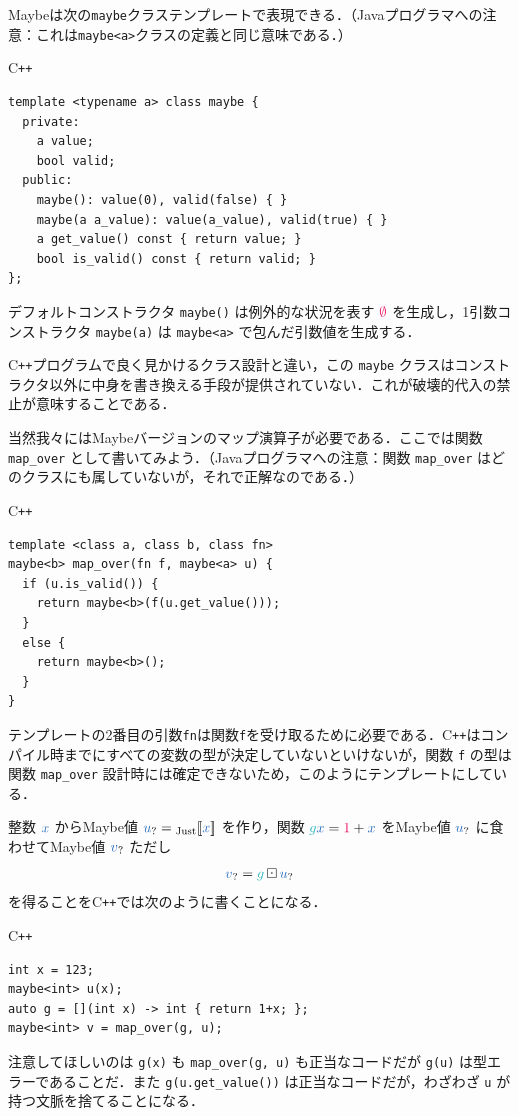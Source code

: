 \documentclass[a5paper,twoside,fleqn,draft]{jsbook}
\def\[{[\![}
\def\]{]\!]}
\def\constantColor{WildStrawberry}
\def\varColor{NavyBlue}
\def\funcColor{BlueGreen}
\newcommand{\programminglanguage}[1]{\textsf{#1}}
\newcommand{\cxx}{\programminglanguage{C}\texttt{++}}
\newcommand{\cxxzerothree}{\cxx\programminglanguage{03}}
\newcommand{\java}{\programminglanguage{Java}}
\newcommand{\code}[1]{\texttt{#1}}
\newenvironment{cxxcode}{\begin{itembox}[r]{\cxx}}{\end{itembox}}
\newcommand{\mConstant}[1]{\textcolor{\constantColor}{#1}}
\newcommand{\mOneNumber}{{\mConstant{1}}}
\newcommand{\mNothing}{\textcolor{\constantColor}{\emptyset}}
\newcommand{\mVar}[1]{\textcolor{\varColor}{#1}}
\newcommand{\mXVar}{\mVar{x}}
\newcommand{\mFunc}[1]{\textcolor{\funcColor}{#1}}
\newcommand{\mGFunc}{\mFunc{g}}
\DeclareMathOperator{\mMapMaybe}{\boxdot}
\newcommand{\mValueConstructor}[1]{\mathrm{#1}}
\newcommand{\mValueWith}[2]{{}_\mValueConstructor{#1}\[\mVar{#2}\]}
\newcommand{\mJustWith}[1]{\mValueWith{Just}{#1}}
\newcommand{\mMaybe}[1]{\mVar{#1}_?}
\begin{document}
Maybeは次の\code{maybe}クラステンプレートで表現できる．（\java プログラマへの注意：これは\code{maybe<a>}クラスの定義と同じ意味である．）
\begin{cxxcode}
\begin{verbatim}
template <typename a> class maybe {
  private:
    a value;
    bool valid;
  public:
    maybe(): value(0), valid(false) { }
    maybe(a a_value): value(a_value), valid(true) { }
    a get_value() const { return value; }
    bool is_valid() const { return valid; }
};
\end{verbatim}
\end{cxxcode}
デフォルトコンストラクタ \code{maybe()} は例外的な状況を表す $\mNothing$ を生成し，1引数コンストラクタ \code{maybe(a)} は \code{maybe<a>} で包んだ引数値を生成する．

\cxx プログラムで良く見かけるクラス設計と違い，この \code{maybe} クラスはコンストラクタ以外に中身を書き換える手段が提供されていない．これが破壊的代入の禁止が意味することである．

当然我々にはMaybeバージョンのマップ演算子が必要である．ここでは関数 \code{map\_over} として書いてみよう．（\java プログラマへの注意：関数 \code{map\_over} はどのクラスにも属していないが，それで正解なのである．）
\begin{cxxcode}
\begin{verbatim}
template <class a, class b, class fn>
maybe<b> map_over(fn f, maybe<a> u) {
  if (u.is_valid()) {
    return maybe<b>(f(u.get_value()));
  }
  else {
    return maybe<b>();
  }
}
\end{verbatim}
\end{cxxcode}
テンプレートの2番目の引数\code{fn}は関数\code{f}を受け取るために必要である．\cxx はコンパイル時までにすべての変数の型が決定していないといけないが，関数 \code{f} の型は関数 \code{map\_over} 設計時には確定できないため，このようにテンプレートにしている．

整数 $\mXVar$ からMaybe値 $\mMaybe{u}=\mJustWith{x}$ を作り，関数 $\mGFunc\mXVar=\mOneNumber+\mXVar$ をMaybe値 $\mMaybe{u}$ に食わせてMaybe値 $\mMaybe{v}$ ただし
\begin{equation}
  \mMaybe{v}
  =\mGFunc\mMapMaybe\mMaybe{u}
\end{equation}
を得ることを\cxx では次のように書くことになる．
\begin{cxxcode}
\begin{verbatim}
int x = 123;
maybe<int> u(x);
auto g = [](int x) -> int { return 1+x; };
maybe<int> v = map_over(g, u);
\end{verbatim}
\end{cxxcode}
注意してほしいのは \code{g(x)} も \code{map\_over(g, u)} も正当なコードだが \code{g(u)} は型エラーであることだ．また \code{g(u.get\_value())} は正当なコードだが，わざわざ \code{u} が持つ文脈を捨てることになる．
\end{document}

